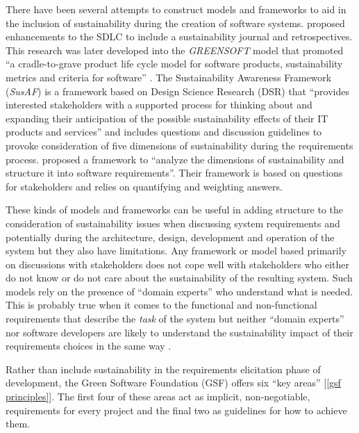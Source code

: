 There have been several attempts to construct models and frameworks to aid in the inclusion of sustainability during the creation of software systems. \citet{Dick2010} proposed enhancements to the SDLC to include a sustainability journal and retrospectives. This research was later developed into the \emph{GREENSOFT} model that promoted \enquote{a cradle-to-grave product life cycle model for software products, sustainability metrics and criteria for software} \citep{Naumann2011}. The Sustainability Awareness Framework (\emph{SusAF}) is a framework based on Design Science Research (DSR) \citep{VomBrocke2020} that \enquote{provides interested stakeholders with a supported process for thinking about and expanding their anticipation of the possible sustainability effects of their IT products and services} \citep{Betz2024} and includes questions and discussion guidelines to provoke consideration of five dimensions of sustainability during the requirements process. \citet{Saputri2016} proposed a framework to \enquote{analyze the dimensions of sustainability and structure it into software requirements}. Their framework is based on questions for stakeholders and relies on quantifying and weighting answers.

These kinds of models and frameworks can be useful in adding structure to the consideration of sustainability issues when discussing system requirements and potentially during the architecture, design, development and operation of the system but they also have limitations. Any framework or model based primarily on discussions with stakeholders does not cope well with stakeholders who either do not know or do not care about the sustainability of the resulting system. Such models rely on the presence of \enquote{domain experts} \citep{Christel1992} who understand what is needed. This is probably true when it comes to the functional and non-functional requirements that describe the \emph{task} of the system but neither \enquote{domain experts} nor software developers are likely to understand the sustainability impact of their requirements choices in the same way \citep{Noman2022} \citep{deSouza2014}.

Rather than include sustainability in the requirements elicitation phase of development, the Green Software Foundation (GSF) \citep{GreenSoftwareFioundation2024} offers six \enquote{key areas} [\autoref{gsf principles}]. The first four of these areas act as implicit, non-negotiable, requirements for every project and the final two as guidelines for how to achieve them.

